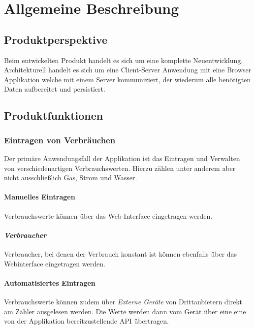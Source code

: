 \section{Allgemeine Beschreibung}


\subsection{Produktperspektive}


Beim entwickelten Produkt handelt es sich um eine komplette Neuentwicklung. Architekturell handelt es sich um eine Client-Server Anwendung mit eine Browser Applikation welche mit einem Server kommuniziert, der wiederum alle benötigten Daten aufbereitet und persistiert.

\subsection{Produktfunktionen}

\subsubsection{Eintragen von Verbräuchen}

Der primäre Anwendungsfall der Applikation ist das Eintragen und Verwalten von verschiedenartigen Verbrauchswerten. Hierzu zählen unter anderem aber nicht ausschließlich Gas, Strom und Wasser.

\paragraph{Manuelles Eintragen}

Verbrauchswerte können über das Web-Interface eingetragen werden.

\paragraph{\textit{Verbraucher}}
Verbraucher, bei denen der Verbrauch konstant ist können ebenfalls über das Webinterface eingetragen werden.

\paragraph{Automatisiertes Eintragen}
\label{autom_eintragen}

Verbrauchswerte können zudem über \textit{Externe Geräte} von Drittanbietern direkt am Zähler ausgelesen werden. Die Werte werden dann vom Gerät über eine eine von der Applikation bereitzustellende API übertragen.

